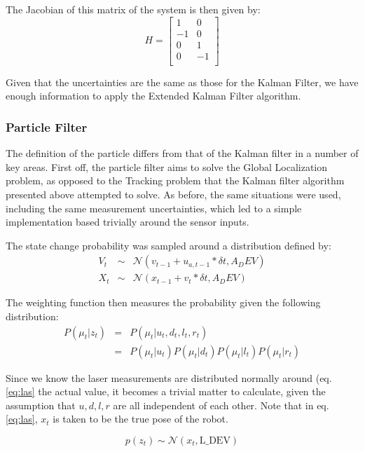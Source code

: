 \documentclass[english]{article}
\begin{document}
The Jacobian of this matrix of the system is then given by:
\begin{equation}
H = \left[ \begin{array}{cc}
1&0\\
-1&0\\
0&1\\
0&-1\\ \end{array} \right]
\end{equation}

Given that the uncertainties are the same as those for the Kalman Filter, we have enough information to apply the Extended Kalman Filter algorithm.

\subsubsection{Particle Filter}
The definition of the particle differs from that of the Kalman filter in a number of key areas. First off, the particle filter aims to solve the Global Localization problem, as opposed to the Tracking problem that the Kalman filter algorithm presented above attempted to solve. As before, the same situations were used, including the same measurement uncertainties, which led to a simple implementation based trivially around the sensor inputs.

The state change probability was sampled around a distribution defined by:
\begin{eqnarray}
V_t &\sim& \mathcal{N}(v_{t-1} + u_{a,t-1}*\delta t, A_DEV) \\
X_t &\sim& \mathcal{N}(x_{t-1} + v_t*\delta t, A_DEV)
\end{eqnarray}

The weighting function then measures the probability given the following distribution:
\begin{eqnarray}
P(\mu_t | z_t) &=& P(\mu_t | u_t, d_t, l_t, r_t) \\
 &=& P(\mu_t | u_t) P(\mu_t | d_t) P(\mu_t | l_t) P(\mu_t | r_t)
\end{eqnarray}

Since we know the laser measurements are distributed normally around (eq. \ref{eq:las} the actual value, it becomes a trivial matter to calculate, given the assumption that $u, d, l, r$ are all independent of each other. Note that in eq. \ref{eq:las}, $x_{t}$ is taken to be the true pose of the robot.

\begin{equation}
\label{eq:las}
p(z_t) \sim \mathcal{N}(x_t, \mathrm{L\_DEV})
\end{equation}
\end{document}
